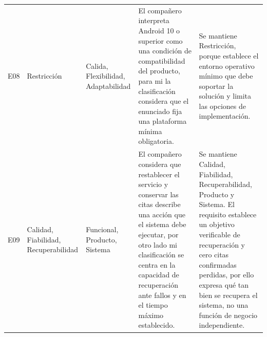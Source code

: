 \documentclass[conference,onecolumn]{IEEEtran}
\begin{document}
{\begin{longtable}{@{}L{0.05\textwidth}L{0.14\textwidth}L{0.14\textwidth}L{0.31\textwidth}L{0.31\textwidth}@{}}
E08 & Restricción & Calida, Flexibilidad, Adaptabilidad & El compañero interpreta Android 10 o superior como una condición de compatibilidad del producto, para mi la clasificación considera que el enunciado fija una plataforma mínima obligatoria. & Se mantiene Restricción, porque establece el entorno operativo mínimo que debe soportar la solución y limita las opciones de implementación.\\
E09 & Calidad, Fiabilidad, Recuperabilidad & Funcional, Producto, Sistema & El compañero considera que restablecer el servicio y conservar las citas describe una acción que el sistema debe ejecutar, por otro lado mi clasificación se centra en la capacidad de recuperación ante fallos y en el tiempo máximo establecido. & Se mantiene Calidad, Fiabilidad, Recuperabilidad, Producto y Sistema. El requisito establece un objetivo verificable de recuperación y cero citas confirmadas perdidas, por ello expresa qué tan bien se recupera el sistema, no una función de negocio independiente.\\
\end{longtable}
}

\printbibliography[title={Referencias}]
\end{document}
